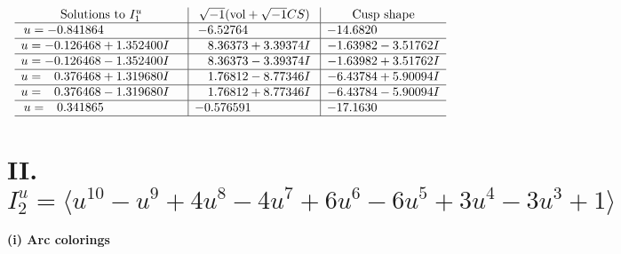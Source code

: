 \documentclass[1p]{elsarticle_modified}
\theoremstyle{definition}
\newcommand{\I}{\sqrt{-1}}
\begin{document}
$$\begin{array}{c|c|c}  
\text{Solutions to }I^u_{1}& \I (\text{vol} + \sqrt{-1}CS) & \text{Cusp shape}\\
 \hline 
\begin{aligned}
u &= -0.841864\phantom{ +0.000000I}\end{aligned}
 & -6.52764\phantom{ +0.000000I} & -14.6820\phantom{ +0.000000I} \\ \hline\begin{aligned}
u &= -0.126468 + 1.352400 I\end{aligned}
 & \phantom{-}8.36373 + 3.39374 I & -1.63982 - 3.51762 I \\ \hline\begin{aligned}
u &= -0.126468 - 1.352400 I\end{aligned}
 & \phantom{-}8.36373 - 3.39374 I & -1.63982 + 3.51762 I \\ \hline\begin{aligned}
u &= \phantom{-}0.376468 + 1.319680 I\end{aligned}
 & \phantom{-}1.76812 - 8.77346 I & -6.43784 + 5.90094 I \\ \hline\begin{aligned}
u &= \phantom{-}0.376468 - 1.319680 I\end{aligned}
 & \phantom{-}1.76812 + 8.77346 I & -6.43784 - 5.90094 I \\ \hline\begin{aligned}
u &= \phantom{-}0.341865\phantom{ +0.000000I}\end{aligned}
 & -0.576591\phantom{ +0.000000I} & -17.1630\phantom{ +0.000000I}\\
 \hline 
 \end{array}$$\newpage\newpage\renewcommand{\arraystretch}{1}
\centering \section*{II. $I^u_{2}= \langle u^{10}- u^9+4 u^8-4 u^7+6 u^6-6 u^5+3 u^4-3 u^3+1 \rangle$}
\flushleft \textbf{(i) Arc colorings}\\
\end{document}
